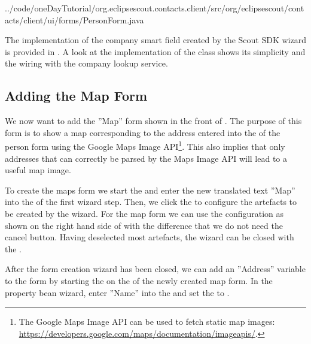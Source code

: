 \documentclass[a4paper,10pt,twoside]{book}
\begin{document}

{../code/oneDayTutorial/org.eclipsescout.contacts.client/src/org/eclipsescout/contacts/client/ui/forms/PersonForm.java}

The implementation of the company smart field created by the Scout SDK wizard is provided in . 
A look at the implementation of the  class shows its simplicity and the wiring with the company lookup service.

\subsection{Adding the Map Form}

We now want to add the ''Map'' form shown in the front of .
The purpose of this form is to show a map corresponding to the address entered into the  of the person form using the Google Maps Image API\footnote{
The Google Maps Image API can be used to fetch static map images: \url{https://developers.google.com/maps/documentation/imageapis/}.
}.
This also implies that only addresses that can correctly be parsed by the Maps Image API will lead to a useful map image.

To create the maps form we start the  and enter the new translated text ''Map'' into the  of the first wizard step. 
Then, we click the  to configure the artefacts to be created by the wizard. 
For the map form we can use the configuration as shown on the right hand side of  with the difference that we do not need the cancel button.
Having deselected most artefacts, the wizard can be closed with the .

After the form creation wizard has been closed, we can add an ''Address'' variable to the form by starting the  on the  of the newly created map form.
In the property bean wizard, enter ''Name'' into the  and set the  to . 
\end{document}
